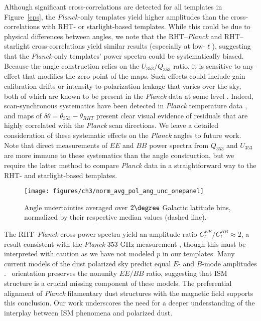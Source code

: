 Although significant cross-correlations are detected for all templates in Figure~\ref{cps}, the \textit{Planck}-only templates yield higher amplitudes than the cross-correlations with RHT- or starlight-based templates. While this could be due to physical differences between angles, we note that the RHT--\textit{Planck} and RHT--starlight cross-correlations yield similar results (especially at low-$\ell$), suggesting that the \textit{Planck}-only templates' power spectra could be systematically biased. Because the angle construction relies on the $U_{353}/Q_{353}$ ratio, it is sensitive to any effect that modifies the zero point of the maps. Such effects could include gain calibration drifts or intensity-to-polarization leakage that varies over the sky, both of which are known to be present in the \textit{Planck} data at some level \cite{Collaboration:2015ta}. Indeed, scan-synchronous systematics have been detected in \textit{Planck} temperature data \cite{Collaborations:2015y,2013PhRvD..88j1301K}, and maps of $\delta \theta = \theta_{353}-\theta_{RHT}$ present clear visual evidence of residuals that are highly correlated with the \textit{Planck} scan directions. We leave a detailed consideration of these systematic effects on the \textit{Planck} angles to future work. Note that direct measurements of $EE$ and $BB$ power spectra from $Q_{353}$ and $U_{353}$ are more immune to these systematics than the angle construction, but we require the latter method to compare \textit{Planck} data in a straightforward way to the RHT- and starlight-based templates.

\begin{figure}
\centering
\texttt{[image: figures/ch3/norm\_avg\_pol\_ang\_unc\_onepanel]}
\caption{Angle uncertainties averaged over $2\degree$ Galactic latitude bins, normalized by their respective median values (dashed line). \label{sigmas}}
\end{figure}

The RHT--\textit{Planck} cross-power spectra yield an amplitude ratio $C_l^{EE}/C_l^{BB} \approx 2$, a result consistent with the \textit{Planck} 353 GHz measurement \cite{Collaboration:2014uh}, though this must be interpreted with caution as we have not modeled $p$ in our templates. Many current models of the dust polarized sky \cite{ODea:2011bm, Delabrouille:2013wf} predict equal $E$- and $B$-mode amplitudes \cite{Collaboration:2014uh}. \HI~orientation preserves the nonunity $EE/BB$ ratio, suggesting that ISM structure is a crucial missing component of these models. The preferential alignment of \textit{Planck} filamentary dust structures with the magnetic field \cite{Collaboration:2015ws} supports this conclusion. Our work underscores the need for a deeper understanding of the interplay between ISM phenomena and polarized dust.


